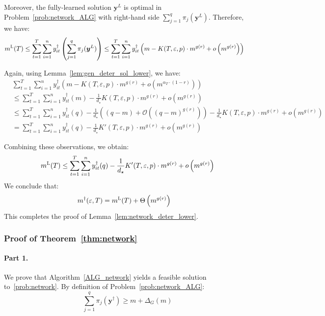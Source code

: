 \documentclass[nonblindrev]{informs3noheader}
\def\calO{\mathcal{O}}
\def\by{\boldsymbol{y}}
\begin{document}
Moreover, the fully-learned solution $\by^{L}$ is optimal in Problem~\eqref{prob:network_ALG} with right-hand side $\sum_{j=1}^q \pi_{j}(\by^{L})$. Therefore, we have:
\begin{align*}
    m^{\textsc{L}}(T)&\leq \sum_{t=1}^T \sum_{i=1}^n y_{it}^\dagger\left(\sum_{j=1}^q \pi_{j}(\by^{L})\right)
    \leq \sum_{t=1}^T \sum_{i=1}^n y_{it}^\dagger\left(m-K(T,\varepsilon,p)\cdot m^{g(r)}+ o\left(m^{g(r)}\right)\right)
\end{align*}

Again, using Lemma~\ref{lem:gen_deter_sol_lower}, we have:
\begin{align*}
   &\sum_{t=1}^T \sum_{i=1}^n y_{it}^\dagger\left(m - K(T,\varepsilon,p)\cdot m^{g(r)}+o\left(m^{\alpha_T\cdot(1-r)}\right)\right)\\
   &\leq \sum_{t=1}^T \sum_{i=1}^n y_{it}^\dagger(m)-\frac{1}{d_\star}K(T,\varepsilon,p)\cdot m^{g(r)} + o\left(m^{g(r)}\right)\\
   &\leq \sum_{t=1}^T \sum_{i=1}^n y_{it}^\dagger(q)-\frac{1}{d_\star}\left((q-m)+\calO\left((q-m)^{g(r)}\right)\right)-\frac{1}{d_\star}K(T,\varepsilon,p)\cdot m^{g(r)} + o\left(m^{g(r)}\right)\\
   &= \sum_{t=1}^T \sum_{i=1}^n y_{it}^\dagger(q)-\frac{1}{d_\star}K'(T,\varepsilon,p)\cdot m^{g(r)} + o\left(m^{g(r)}\right)
\end{align*}

Combining these observations, we obtain:
$$m^{\textsc{L}}(T)\leq\sum_{t=1}^T \sum_{i=1}^n y_{it}^\dagger(q)-\frac{1}{d_\star}K'(T,\varepsilon,p)\cdot m^{g(r)} + o\left(m^{g(r)}\right)$$
We conclude that:
\begin{align*}
    m^\dagger(\varepsilon, T)
    &= m^{\textsc{L}}(T)+\Theta\left(m^{g(r)}\right)
\end{align*}
This completes the proof of Lemma~\ref{lem:network_deter_lower}. \hfill\Halmos

\subsubsection*{Proof of Theorem~\ref{thm:network}}

\paragraph{Part 1.}

We prove that Algorithm~\ref{ALG_network} yields a feasible solution to~\eqref{prob:network}. By definition of Problem~\eqref{prob:network_ALG}:
\[\sum_{j=1}^q \pi_{j}(\by^\dagger) \geq m + \Delta_G(m)\]
\end{document}
